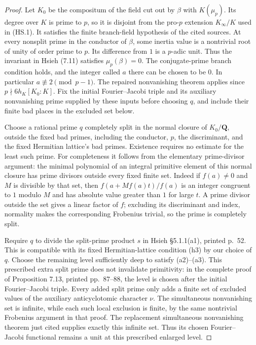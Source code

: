 \begin{proof}
Let $K_0$ be the compositum of the field cut out by
$\beta$ with $K(\mu_p)$.  Its degree over $K$ is prime
to $p$, so it is disjoint from the pro-$p$ extension
$K_\infty/K$ used in (HS.1).  It satisfies the finite
branch-field hypothesis of the cited sources.
At every nonsplit prime in the conductor of $\beta$,
some inertia value is a nontrivial root of unity of
order prime to $p$.  Its difference from $1$ is a
$p$-adic unit.  Thus the invariant in Hsieh (7.11)
satisfies $\mu_p(\beta)=0$.
The conjugate-prime branch condition holds, and the
integer called $a$ there can be chosen to be $0$.
In particular $a\not\equiv2\pmod{p-1}$.
The repaired nonvanishing theorem applies since
$p\nmid6h_K[K_0:K]$.
Fix the initial Fourier--Jacobi triple and its auxiliary
nonvanishing prime supplied by these inputs before
choosing $q$, and include their finite bad places in
the excluded set below.

Choose a rational prime $q$ completely split in the
normal closure of $K_0/\mathbf Q$, outside the fixed
bad primes, including the conductor, $p$, the
discriminant, and the fixed Hermitian lattice's bad
primes.  Existence requires no estimate for the least
such prime.  For completeness it follows from the
elementary prime-divisor argument: the minimal
polynomial of an integral primitive element of this
normal closure has prime divisors outside every fixed
finite set.  Indeed if $f(a)\ne0$ and $M$ is divisible
by that set, then
$f(a+Mf(a)t)/f(a)$ is an integer congruent to $1$
modulo $M$ and has absolute value greater than $1$
for large $t$.  A prime divisor outside the set gives
a linear factor of $f$; excluding its discriminant
and index, normality makes the corresponding Frobenius
trivial, so the prime is completely split.

Require $q$ to divide the split-prime product $s$ in
Hsieh \S5.1.1(a1), printed p.~52.
This is compatible with its fixed Hermitian-lattice
condition (h3) by our choice of $q$.
Choose the remaining level sufficiently deep to
satisfy (a2)--(a3).
This prescribed extra split prime does not invalidate
primitivity: in the complete proof of Proposition 7.13,
printed pp.~87--88, the level is chosen after the
initial Fourier--Jacobi triple.  Every added split
prime only adds a finite set of excluded values of
the auxiliary anticyclotomic character $\nu$.
The simultaneous nonvanishing set is infinite, while
each such local exclusion is finite, by the same
nontrivial Frobenius argument in that proof.
The replacement simultaneous nonvanishing theorem
just cited supplies exactly this infinite set.
Thus its chosen Fourier--Jacobi functional remains
a unit at this prescribed enlarged level.


\end{proof}
